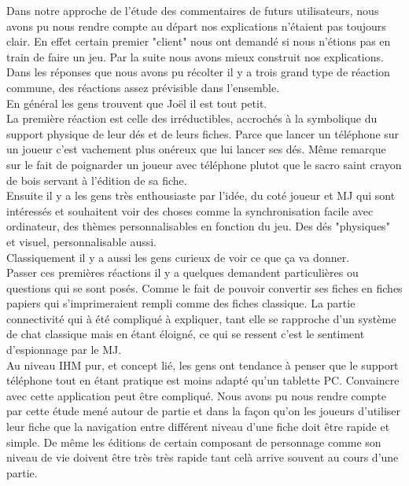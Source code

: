 \documentclass[11pt,a4paper]{article}
\begin{document}
Dans notre approche de l'étude des commentaires de futurs utilisateurs, nous avons pu nous rendre compte
au départ nos explications n'étaient pas toujours clair. En effet certain premier "client" nous ont demandé si
nous n'étions pas en train de faire un jeu. Par la suite nous avons mieux construit nos explications.\\

Dans les réponses que nous avons pu récolter il y a trois grand type de réaction commune, des réactions 
assez prévisible dans l'ensemble.\\

En général les gens trouvent que Joël il est tout petit.\\

La première réaction est celle des irréductibles, accrochés à la symbolique du support physique de leur dés et de
leurs fiches. Parce que lancer un téléphone sur un joueur c'est vachement plus onéreux que lui lancer ses dés. 
Même remarque sur le fait de poignarder un joueur avec téléphone plutot que le sacro saint crayon de bois servant à
l'édition de sa fiche.\\

Ensuite il y a les gens très enthousiaste par l'idée, du coté joueur et MJ qui sont intéressés
et souhaitent voir des choses comme la synchronisation facile avec ordinateur, 
des thèmes personnalisables en fonction du jeu. Des dés "physiques" et visuel, personnalisable aussi.\\

Classiquement il y a aussi les gens curieux de voir ce que ça va donner.\\

Passer ces premières réactions il y a quelques demandent particulières ou questions qui se sont posés.
Comme le fait de pouvoir convertir ses fiches en fiches papiers qui s'imprimeraient rempli comme des fiches
classique. La partie connectivité qui à été compliqué à expliquer, tant elle se rapproche d'un système de chat 
classique mais en étant éloigné, ce qui se ressent c'est le sentiment d'espionnage par le MJ.\\

Au niveau IHM pur, et concept lié, les gens ont tendance à penser que le support téléphone tout en
étant pratique est moins adapté qu'un tablette PC. Convaincre avec cette application peut être compliqué.
Nous avons pu nous rendre compte par cette étude mené autour de partie et dans la façon qu'on les joueurs 
d'utiliser leur fiche que la navigation entre différent niveau d'une fiche doit être rapide et simple. 
De même les éditions de certain composant de personnage comme son niveau de vie doivent être
très très rapide tant celà arrive souvent au cours d'une partie.\\
\end{document}
